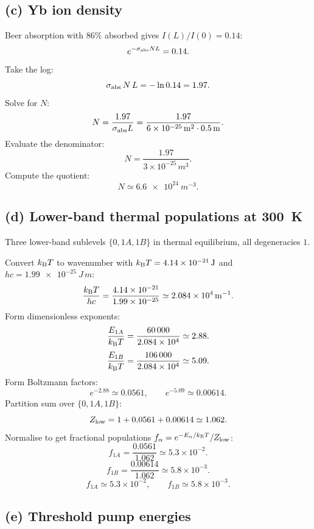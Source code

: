 \documentclass[11pt]{article}
\begin{document}
\subsection*{(c) Yb ion density}

Beer absorption with $86\%$ absorbed gives $I(L)/I(0)=0.14$:
\[
e^{-\sigma_{\rm abs}NL}=0.14.
\]
Take the log:
\[
\sigma_{\rm abs}\,N\,L=-\ln 0.14=1.97.
\]
Solve for $N$:
\[
N=\frac{1.97}{\sigma_{\rm abs} L}=\frac{1.97}{\SI{6e-25}{m^2}\cdot\SI{0.5}{m}}.
\]
Evaluate the denominator:
\[
N=\frac{1.97}{3\times 10^{-25}\,\si{m^{3}}}.
\]
Compute the quotient:
\begin{equation}
\boxed{\;N\simeq\SI{6.6e24}{m^{-3}}.\;}
\label{eq:N-yb}
\end{equation}

\subsection*{(d) Lower-band thermal populations at \SI{300}{K}}

Three lower-band sublevels $\{0,1A,1B\}$ in thermal equilibrium, all degeneracies $1$.

Convert $k_{\rm B}T$ to wavenumber with $k_{\rm B}T=\SI{4.14e-21}{J}$ and $hc=\SI{1.99e-25}{J\,m}$:
\[
\frac{k_{\rm B}T}{hc}=\frac{4.14\times 10^{-21}}{1.99\times 10^{-25}}\simeq\SI{2.084e4}{m^{-1}}.
\]
Form dimensionless exponents:
\[
\frac{E_{1A}}{k_{\rm B}T}=\frac{60\,000}{2.084\times 10^{4}}\simeq 2.88.
\]
\[
\frac{E_{1B}}{k_{\rm B}T}=\frac{106\,000}{2.084\times 10^{4}}\simeq 5.09.
\]
Form Boltzmann factors:
\[
e^{-2.88}\simeq 0.0561,\qquad e^{-5.09}\simeq 0.00614.
\]
Partition sum over $\{0,1A,1B\}$:
\[
Z_{\rm low}=1+0.0561+0.00614\simeq 1.062.
\]
Normalise to get fractional populations $f_\alpha=e^{-E_\alpha/k_{\rm B}T}/Z_{\rm low}$:
\[
f_{1A}=\frac{0.0561}{1.062}\simeq 5.3\times 10^{-2}.
\]
\[
f_{1B}=\frac{0.00614}{1.062}\simeq 5.8\times 10^{-3}.
\]
\begin{equation}
\boxed{\;f_{1A}\simeq 5.3\times 10^{-2},\qquad f_{1B}\simeq 5.8\times 10^{-3}.\;}
\label{eq:frac-low}
\end{equation}

\subsection*{(e) Threshold pump energies}
\end{document}
